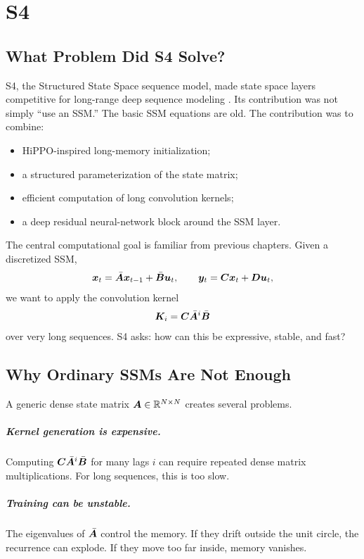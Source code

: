 \chapter{S4}
\label{ch:s4}

\section{What Problem Did S4 Solve?}

S4, the Structured State Space sequence model, made state space layers competitive for
long-range deep sequence modeling \citep{gu2022s4}. Its contribution was not simply
``use an SSM.'' The basic SSM equations are old. The contribution was to combine:

\begin{itemize}
  \item HiPPO-inspired long-memory initialization;
  \item a structured parameterization of the state matrix;
  \item efficient computation of long convolution kernels;
  \item a deep residual neural-network block around the SSM layer.
\end{itemize}

The central computational goal is familiar from previous chapters. Given a discretized
SSM,
\[
  \bm{x}_t = \bar{\bm{A}}\bm{x}_{t-1}+\bar{\bm{B}}\bm{u}_t,
  \qquad
  \bm{y}_t = \bm{C}\bm{x}_t+\bm{D}\bm{u}_t,
\]
we want to apply the convolution kernel
\[
  \bm{K}_i = \bm{C}\bar{\bm{A}}^i\bar{\bm{B}}
\]
over very long sequences. S4 asks: how can this be expressive, stable, and fast?

\section{Why Ordinary SSMs Are Not Enough}

A generic dense state matrix $\bm{A}\in\mathbb{R}^{N\times N}$ creates several problems.

\paragraph{Kernel generation is expensive.}
Computing $\bm{C}\bar{\bm{A}}^i\bar{\bm{B}}$ for many lags $i$ can require repeated dense matrix
multiplications. For long sequences, this is too slow.

\paragraph{Training can be unstable.}
The eigenvalues of $\bar{\bm{A}}$ control the memory. If they drift outside the unit circle,
the recurrence can explode. If they move too far inside, memory vanishes.

